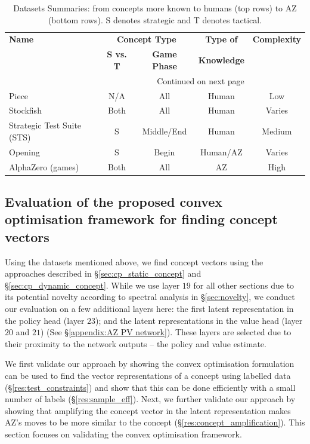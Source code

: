 \documentclass{article}
\begin{document}
\begin{longtable}{p{4cm} c c c c} 
\caption{Datasets Summaries: from concepts more known to humans (top rows) to AZ (bottom rows). S denotes strategic and T denotes tactical.}
\label{table:summary_dataset_main} \\ 
\toprule
\textbf{Name} &  \multicolumn{2}{c}{\textbf{Concept Type}} &  \textbf{Type of}  & \textbf{Complexity} \\  
& \textbf{S vs. T} & \textbf{Game Phase} &\textbf{Knowledge} &  \\ 
\midrule
\endhead
\midrule
\multicolumn{4}{r}{{Continued on next page}} \\
\midrule
\endfoot
\bottomrule
\endlastfoot
Piece  & N/A & All & Human & Low \\
Stockfish  & Both & All & Human & Varies \\ 
Strategic Test Suite (STS) &  S & Middle/End & Human & Medium \\ 
Opening  & S & Begin & Human/AZ & Varies \\
AlphaZero (games)  & Both & All & AZ & High \\ 
\end{longtable}

\subsection{Evaluation of the proposed convex optimisation framework for finding concept vectors} \label{sec:eval_supervised}
Using the datasets mentioned above, we find concept vectors using the approaches described in \S\ref{sec:cp_static_concept} and \S\ref{sec:cp_dynamic_concept}. While we use layer $19$ for all other sections due to its potential novelty according to spectral analysis in \S\ref{sec:novelty}, we conduct our evaluation on a few additional layers here:
the first latent representation in the policy head (layer $23$); and the latent representations in the value head (layer $20$ and $21$) (See \S\ref{appendix:AZ PV network}). These layers are selected due to their proximity to the network outputs -- the policy and value estimate.

We first validate our approach by showing the convex optimisation formulation can be used to find the vector representations of a concept using labelled data (\S\ref{res:test_constraints}) and show that this can be done efficiently with a small number of labels (\S\ref{res:sample_eff}). 
Next, we further validate our approach by showing that amplifying the concept vector in the latent representation 
makes AZ's moves to be more similar to the concept (\S\ref{res:concept_amplification}). 
This section focuses on validating the convex optimisation framework. 
\end{document}
